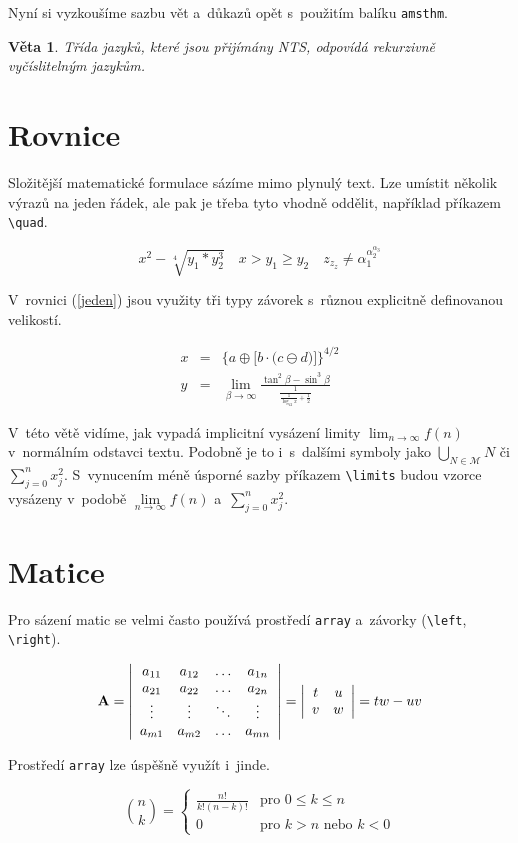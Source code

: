 \documentclass[11pt, a4paper, twocolumn]{article}
\begin{document}
Nyní si vyzkoušíme sazbu vět a~důkazů opět s~použitím balíku \verb|amsthm|.
\newtheorem{lem}{Věta}
\begin{lem}\emph{Třída jazyků, které jsou přijímány NTS, odpovídá} rekurzivně vyčíslitelným jazykům.
\end{lem}

\section{Rovnice}

Složitější matematické formulace sázíme mimo plynulý text. Lze umístit několik výrazů na jeden řádek, ale pak je třeba tyto vhodně oddělit, například příkazem \verb|\quad|.

\[x^{2} - \sqrt[4]{y_{1}*y_{2}^{3}}\quad  x>y_{1}\geq y_{2}\quad z_{z_{z}}\neq \alpha_{1}^{\alpha_{2}^{\alpha_{3}}}\]

V~rovnici (\ref{jeden}) jsou využity tři typy závorek s~různou explicitně definovanou velikostí.

\begin{eqnarray}
\label{jeden}x &=& \bigg\{a\oplus \Big[b\cdot\big(c\ominus d\big)\Big]\bigg\}^{4/2}
\\
\label{dva}y &=& \lim_{\beta\to\infty}\frac{\tan^{2}\beta - \sin^{3}\beta}{\frac{1}{\frac{1}{\log_{42} x}+\frac{1}{2}}}
\end{eqnarray}

V~této větě vidíme, jak vypadá implicitní vysázení limity $\lim_{n\to\infty}f(n)$ v~normálním odstavci textu. Podobně je to i~s~dalšími symboly jako $\bigcup_{N\in\mathcal{M}}N$ či $\sum^{n}_{j=0}x^{2}_{j}$. 
S~vynucením méně úsporné sazby příkazem \verb|\limits| budou vzorce vysázeny v~podobě $\lim\limits_{n\to\infty}f(n)$ a~$\sum\limits^{n}_{j=0}x^{2}_{j}$. 


\section{Matice}

Pro sázení matic se velmi často používá prostředí \verb|array| a~závorky (\verb|\left|, \verb|\right|). 

\[\textrm{\bf A}=\left|\begin{array}{cccc}a_{11}&a_{12}&\ldots&a_{1n}\\ a_{21}&a_{22}&\ldots&a_{2n}\\ \vdots&\vdots&\ddots&\vdots\\ a_{m1}&a_{m2}&\ldots&a_{mn}\end{array}\right| = \left|\begin{array}{cc}t&u\\v&w\end{array}\right| =
tw - uv\]

Prostředí \verb|array| lze úspěšně využít i~jinde.

\[\binom{n}{k}=\left\{\begin{array}{cl}
\frac{n!}{k!(n-k)!} &\mbox{pro } 0\leq k\leq n \\[.2em]
0 &\mbox{pro } k>n \mbox{ nebo } k<0 \end{array}\right.\]
\end{document}
